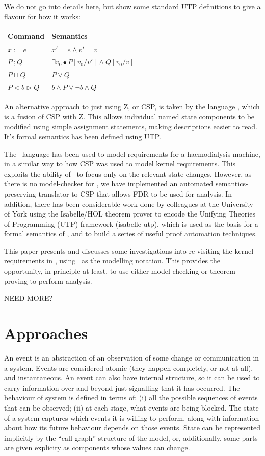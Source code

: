 We do not go into details here, but show some standard UTP definitions
to give a flavour for how it works:

\begin{tabular}{ll}
\hline
   \textbf{Command} & \textbf{Semantics}
\\\hline
     $x:=e$
   & $x'=e \land v'=v$
\\   $P~;Q$
   & $\exists v_0 \bullet P[v_0/v'] \land Q [v_0/v]$
\\   $P\sqcap Q$
   & $P\lor Q$
\\   $P \lhd b \rhd Q$
   & $b \land P \lor \lnot b \land Q$
\\\hline
\end{tabular}

An alternative approach to just using Z, or CSP,
is taken by the language \Circus\cite{WC01,OCW2007},
which is a fusion of CSP with Z.
This allows individual named state components to be modified using simple
assignment statements, making descriptions easier to read.
It's formal semantics has been defined using UTP\cite{OCW2007}.


The \Circus\ language has been used to model requirements
for a haemodialysis machine\cite{DBLP:conf/asm/GomesB16},
in a similar way to how CSP was used to model kernel requirements.
This exploits the ability of \Circus\ to focus only on the relevant state changes.
However, as there is no model-checker for \Circus,
we have implemented an automated semantics-preserving translator to CSP
that allows FDR to be used for analysis.
In addition, there has been considerable work done by colleagues at
the University of York using the Isabelle/HOL theorem prover\cite{NPW02}
to encode the Unifying Theories of Programming (UTP) framework (\textsf{isabelle-utp}),
which is used as the basis for a formal semantics of \Circus,
and to build a series of useful proof automation techniques\cite{FosterZW14}.

This paper presents and discusses some investigations
into re-visiting the kernel requirements in \cite{IMAKQP-D02},
using \Circus\ as the modelling notation.
This provides the opportunity, in principle at least,
to use either model-checking or theorem-proving to perform analysis.

NEED MORE?
\section{Approaches}

An event is an abstraction of an observation of some change
or communication in a system. Events are considered atomic
(they happen completely, or not at all), and instantaneous.
An event can also have internal structure,
so it can be used to carry information over and beyond
just signalling that it has occurred.
The behaviour of system is defined in terms of:
(i) all the possible sequences of events that can be observed;
(ii) at each stage, what events are being blocked.
The state of a system captures which events it is willing to perform,
along with information about how its future behaviour depends on those events.
State can be represented implicitly by the ``call-graph'' structure of the model,
or, additionally,
some parts are given explicity as components whose values can change.

